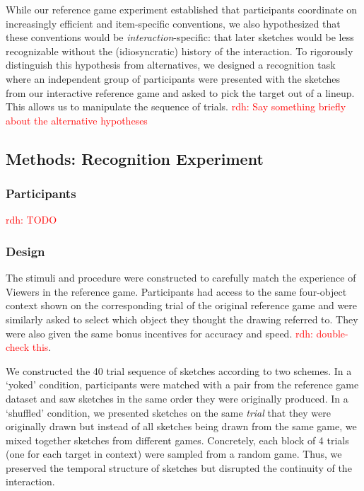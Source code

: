 \documentclass[10pt,letterpaper]{article}
\newcommand{\rdh}[1]{\textcolor{Red}{rdh: #1}}
\begin{document}
While our reference game experiment established that participants coordinate on increasingly efficient and item-specific conventions, we also hypothesized that these conventions would be \emph{interaction}-specific: that later sketches would be less recognizable without the (idiosyncratic) history of the interaction.
To rigorously distinguish this hypothesis from alternatives, we designed a recognition task where an independent group of participants were presented with the sketches from our interactive reference game and asked to pick the target out of a lineup.
This allows us to manipulate the sequence of trials.
\rdh{Say something briefly about the alternative hypotheses}

\subsection{Methods: Recognition Experiment}

\subsubsection{Participants}

\rdh{TODO}

\subsubsection{Design}

The stimuli and procedure were constructed to carefully match the experience of Viewers in the reference game.
Participants had access to the same four-object context shown on the corresponding trial of the original reference game and were similarly asked to select which object they thought the drawing referred to. 
They were also given the same bonus incentives for accuracy and speed. \rdh{double-check this}.

We constructed the 40 trial sequence of sketches according to two schemes.
In a `yoked' condition, participants were matched with a pair from the reference game dataset and saw sketches in the same order they were originally produced. 
In a `shuffled' condition, we presented sketches on the same \emph{trial} that they were originally drawn but instead of all sketches being drawn from the same game, we mixed together sketches from different games.
Concretely, each block of 4 trials (one for each target in context) were sampled from a random game.
Thus, we preserved the temporal structure of sketches but disrupted the continuity of the interaction.
\end{document}
